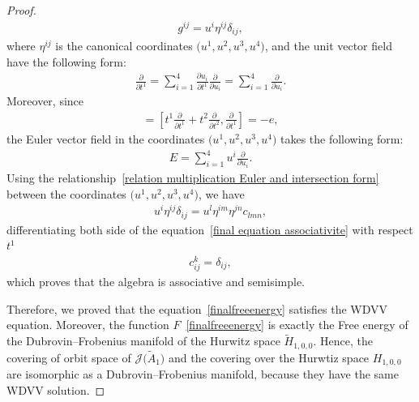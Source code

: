 \documentclass[pdftex]{sigma}%
\numberwithin{equation}{section}
\newcommand{\Ja}{\mathcal{J}}
\begin{document}
\begin{proof}
\begin{gather*}
g^{ij}=u^i\eta^{ij}\delta_{ij},
\end{gather*}
where $\eta^{ij}$ is the canonical coordinates $\big(u^1,u^2,u^3,u^4\big)$,
 and the unit vector field have the following form:
\begin{gather*}
\frac{\partial}{\partial t^1}=\sum_{i=1}^4 \frac{\partial u_i}{\partial t^1}\frac{\partial}{\partial u_i}=\sum_{i=1}^4 \frac{\partial}{\partial u_i}.
\end{gather*}
Moreover, since
\begin{gather*}
[E,e]=\left[t^1\frac{\partial}{\partial t^1} +t^2\frac{\partial}{\partial t^2},\frac{\partial}{\partial t^1}\right]=-e,
\end{gather*}
the Euler vector field in the coordinates $\big(u^1,u^2,u^3,u^4\big)$ takes the following form:
\begin{gather*}
E=\sum_{i=1}^4 u^i\frac{\partial}{\partial u_i}.
\end{gather*}
 Using the relationship~\eqref{relation multiplication Euler and intersection form} between the coordinates $\big(u^1,u^2,u^3,u^4\big)$, we have
 \begin{gather}\label{final equation associativite}
u^i\eta^{ij}\delta_{ij}=u^l\eta^{im}\eta^{jn}c_{lmn},
\end{gather}
differentiating both side of the equation~\eqref{final equation associativite} with respect $t^1$
 \begin{gather*}
 c_{ij}^k=\delta_{ij},
\end{gather*}
which proves that the algebra is associative and semisimple.

Therefore, we proved that the equation~\eqref{finalfreeenergy} satisfies the WDVV equation. Moreover, the function $F$~\eqref{finalfreeenergy} is exactly the Free energy of the Dubrovin--Frobenius manifold of the Hurwitz space $\widetilde H_{1,0,0}$. Hence, the covering of orbit space of $\Ja\big(\tilde A_1\big)$ and the covering over the Hurwtiz space $H_{1,0,0}$ are isomorphic as a Dubrovin--Frobenius manifold, because they have the same WDVV solution.
\end{proof}
\end{document}
